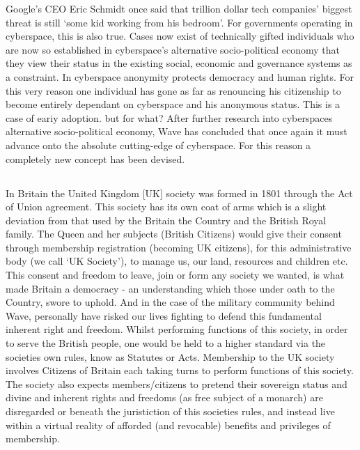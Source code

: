 \documentclass[letterpaper,10pt,openany,oneside,english]{sphinxmanual}
\begin{document}
Google’s CEO Eric Schmidt once said that trillion dollar tech companies’ biggest threat is still ‘some kid working from his bedroom’. For governments operating in cyberspace, this is also true. Cases now exist of technically gifted individuals who are now so established in cyberspace’s alternative socio-political economy that they view their status in the existing social, economic and governance systems as a constraint. In cyberspace anonymity protects democracy and human rights. For this very reason one individual has gone as far as renouncing his citizenship to become entirely dependant on cyberspace and his anonymous status. This is a case of eariy adoption. but for what? After further research into cyberspaces alternative socio-political economy, Wave has concluded that once again it must advance onto the absolute cutting-edge of cyberspace. For this reason a completely new concept has been devised.


\subsection{}
\label{\detokenize{overview:united-kingdom}}
In Britain the United Kingdom {[}UK{]} society was formed in 1801 through the Act of Union agreement. This society has its own coat of arms which is a slight deviation from that used by the Britain the Country and the British Royal family. The Queen and her subjects (British Citizens) would give their consent through membership registration (becoming UK citizens), for this administrative body (we call ‘UK Society’), to manage us, our land, resources and children etc. This consent and freedom to leave, join or form any society we wanted, is what made Britain a democracy - an understanding which those under oath to the Country, swore to uphold. And in the case of the military community behind Wave, personally have risked our lives fighting to defend this fundamental inherent right and freedom. Whilst performing functions of this society, in order to serve the British people, one would be held to a higher standard via the societies own rules, know as Statutes or Acts. Membership to the UK society involves Citizens of Britain each taking turns to perform functions of this society. The society also expects members/citizens to pretend their sovereign status and divine and inherent rights and freedoms (as free subject of a monarch) are disregarded or beneath the juristiction of this societies rules, and instead live within a virtual reality of afforded (and revocable) benefits and privileges of membership.
\end{document}

